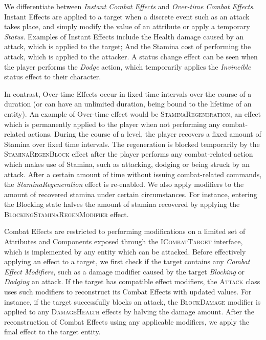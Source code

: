 

We differentiate between \emph{Instant Combat Effects} and \emph{Over-time Combat Effects}. Instant Effects are applied to a target when a discrete event such as an attack takes place, and simply modify the value of an attribute or apply a temporary \emph{Status}. Examples of Instant Effects include the Health damage caused by an attack, which is applied to the target; And the Stamina cost of performing the attack, which is applied to the attacker. A status change effect can be seen when the player performs the \emph{Dodge} action, which temporarily applies the \emph{Invincible} status effect to their character.

In contrast, Over-time Effects occur in fixed time intervals over the course of a duration (or can have an unlimited duration, being bound to the lifetime of an entity). An example of Over-time effect would be \textsc{StaminaRegeneration}, an effect which is permanently applied to the player when not performing any combat-related actions. During the course of a level, the player recovers a fixed amount of Stamina over fixed time intervals. The regeneration is blocked temporarily by the \textsc{StaminaRegenBlock} effect after the player performs any combat-related action which makes use of Stamina, such as attacking, dodging or being struck by an attack. After a certain amount of time without issuing combat-related commands, the \emph{StaminaRegeneration} effect is re-enabled. We also apply modifiers to the amount of recovered stamina under certain circumstances. For instance, entering the Blocking state halves the amount of stamina recovered by applying the \textsc{BlockingStaminaRegenModifier} effect.

Combat Effects are restricted to performing modifications on a limited set of Attributes and Components exposed through the \textsc{ICombatTarget} interface, which is implemented by any entity which can be attacked. Before effectively applying an effect to a target, we first check if the target contains any \emph{Combat Effect Modifiers}, such as a damage modifier caused by the target \emph{Blocking} or \emph{Dodging} an attack. If the target has compatible effect modifiers, the \textsc{Attack} class uses such modifiers to reconstruct its Combat Effects with updated values. For instance, if the target successfully blocks an attack, the \textsc{BlockDamage} modifier is applied to any \textsc{DamageHealth} effects by halving the damage amount. After the reconstruction of Combat Effects using any applicable modifiers, we apply the final effect to the target entity.


